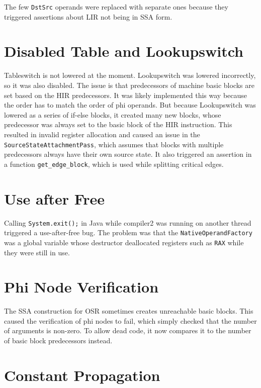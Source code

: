 \documentclass[draft,final]{vutinfth} %
\begin{document}
    The few \lstinline{DstSrc} operands were replaced with separate ones
    because they triggered assertions about LIR not being in SSA form.


    \section{Disabled Table and Lookupswitch}

    Tableswitch is not lowered at the moment.
    Lookupswitch was lowered incorrectly, so it was also disabled.
    The issue is that predecessors of machine basic blocks are set based on the HIR predecessors.
    It was likely implemented this way because the order has to match the order of phi operands.
    But because Lookupswitch was lowered as a series of if-else blocks, it created many new blocks,
    whose predecessor was always set to the basic block of the HIR instruction.
    This resulted in invalid register allocation and caused an issue in the \lstinline{SourceStateAttachmentPass},
    which assumes
    that blocks with multiple predecessors always have their own source state.
    It also triggered an assertion in a function \lstinline{get_edge_block}, which is used while splitting critical edges.


    \section{Use after Free}

    Calling \lstinline{System.exit();} in Java
    while compiler2 was running on another thread
    triggered a use-after-free bug.
    The problem was that the \lstinline{NativeOperandFactory} was a global variable
    whose destructor deallocated registers such as \lstinline{RAX} while they were still in use.


    \section{Phi Node Verification}

    The SSA construction for OSR sometimes creates unreachable basic blocks.
    This caused the verification of phi nodes to fail, which simply checked that the number of arguments is non-zero.
    To allow dead code, it now compares it to the number of basic block predecessors instead.


    \section{Constant Propagation}
\end{document}
